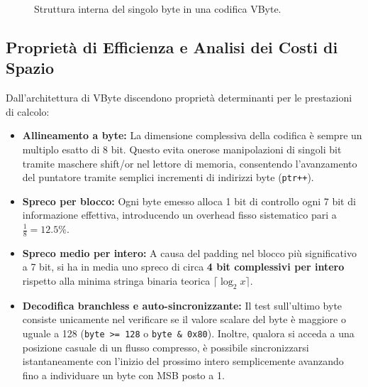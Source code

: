 \begin{figure}[H]
\centering
{}
\caption{Struttura interna del singolo byte in una codifica VByte.}
\label{fig:vbyte-struttura-byte}
\end{figure}

\FloatBarrier
\subsection{Propriet\`a di Efficienza e Analisi dei Costi di Spazio}
\label{subsec:proprieta-spazio-vbyte}

Dall'architettura di VByte discendono propriet\`a determinanti per le prestazioni di calcolo:
\begin{itemize}
  \item \textbf{Allineamento a byte:} La dimensione complessiva della codifica \`e sempre un multiplo esatto di 8 bit. Questo evita onerose manipolazioni di singoli bit tramite maschere shift/or nel lettore di memoria, consentendo l'avanzamento del puntatore tramite semplici incrementi di indirizzi byte (\texttt{ptr++}).
  \item \textbf{Spreco per blocco:} Ogni byte emesso alloca 1 bit di controllo ogni 7 bit di informazione effettiva, introducendo un overhead fisso sistematico pari a $\frac{1}{8} = 12.5\%$.
  \item \textbf{Spreco medio per intero:} A causa del padding nel blocco pi\`u significativo a 7 bit, si ha in media uno spreco di circa \textbf{4 bit complessivi per intero} rispetto alla minima stringa binaria teorica $\lceil \log_2 x \rceil$.
  \item \textbf{Decodifica branchless e auto-sincronizzante:} Il test sull'ultimo byte consiste unicamente nel verificare se il valore scalare del byte \`e maggiore o uguale a 128 (\texttt{byte >= 128} o \texttt{byte \& 0x80}). Inoltre, qualora si acceda a una posizione casuale di un flusso compresso, \`e possibile sincronizzarsi istantaneamente con l'inizio del prossimo intero semplicemente avanzando fino a individuare un byte con MSB posto a 1.
\end{itemize}

